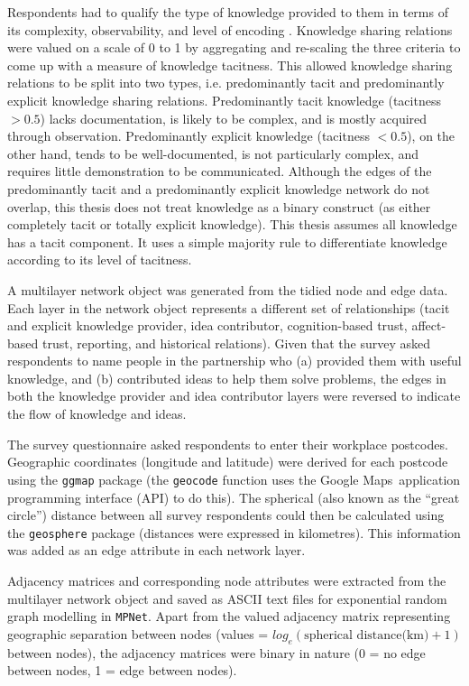 Respondents had to qualify the type of knowledge provided to them in terms of its complexity, observability, and level of encoding \citep{winter1987knowledge,zander1995knowledge,cavusgil2003tacit}. Knowledge sharing relations were valued on a scale of 0 to 1 by aggregating and re-scaling the three criteria to come up with a measure of knowledge tacitness. This allowed knowledge sharing relations to be split into two types, i.e. predominantly tacit and predominantly explicit knowledge sharing relations. Predominantly tacit knowledge (tacitness $> 0.5$) lacks documentation, is likely to be complex, and is mostly acquired through observation. Predominantly explicit knowledge (tacitness $< 0.5$), on the other hand, tends to be well-documented, is not particularly complex, and requires little demonstration to be communicated. Although the edges of the predominantly tacit and a predominantly explicit knowledge network do not overlap, this thesis does not treat knowledge as a binary construct (as either completely tacit or totally explicit knowledge). This thesis assumes all knowledge has a tacit component. It uses a simple majority rule to differentiate knowledge according to its level of tacitness. \medskip

A multilayer network object was generated from the tidied node and edge data. Each layer in the network object represents a different set of relationships (tacit and explicit knowledge provider, idea contributor, cognition-based trust, affect-based trust, reporting, and historical relations). Given that the survey asked respondents to name people in the partnership who (a) provided them with useful knowledge, and (b) contributed ideas to help them solve problems, the edges in both the knowledge provider and idea contributor layers were reversed to indicate the flow of knowledge and ideas. \medskip

The survey questionnaire asked respondents to enter their workplace postcodes. Geographic coordinates (longitude and latitude) were derived for each postcode using the \texttt{ggmap} package (the \texttt{geocode} function uses the Google Maps\texttrademark\ application programming interface (API) to do this). The spherical (also known as the \enquote{great circle}) distance between all survey respondents could then be calculated using the \texttt{geosphere} package (distances were expressed in kilometres). This information was added as an edge attribute in each network layer. \medskip

Adjacency matrices and corresponding node attributes were extracted from the multilayer network object and saved as ASCII text files for exponential random graph modelling in \texttt{MPNet}. Apart from the valued adjacency matrix representing geographic separation between nodes (values = $log_e(\text{spherical distance(km)} + 1)$ between nodes), the adjacency matrices were binary in nature (0 = no edge between nodes, 1 = edge between nodes). 

